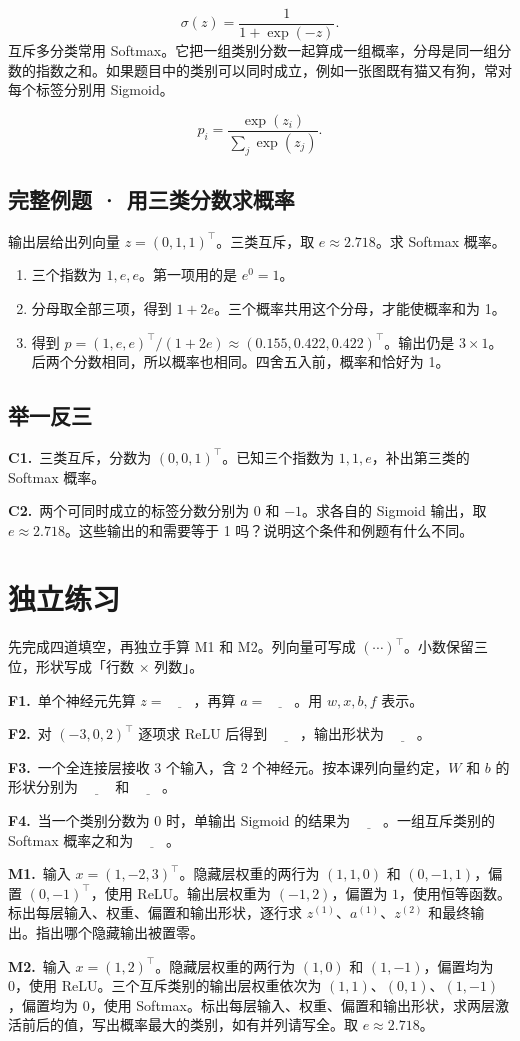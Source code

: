 \documentclass[UTF8,a4paper,11pt]{ctexart}
\newcommand{\CompactQuestion}[2]{\par\noindent\textbf{#1.}\ #2\par\vspace{.8em}}
\begin{document}
\[\sigma(z)=\frac{1}{1+\exp(-z)}.\]
互斥多分类常用 Softmax。它把一组类别分数一起算成一组概率，分母是同一组分数的指数之和。如果题目中的类别可以同时成立，例如一张图既有猫又有狗，常对每个标签分别用 Sigmoid。

\[p_i=\frac{\exp(z_i)}{\sum_j\exp(z_j)}.\]
\subsection{完整例题 · 用三类分数求概率}
输出层给出列向量 $z=(0,1,1)^\top$。三类互斥，取 $e\approx2.718$。求 Softmax 概率。

\begin{enumerate}
\item 三个指数为 $1,e,e$。第一项用的是 $e^0=1$。
\item 分母取全部三项，得到 $1+2e$。三个概率共用这个分母，才能使概率和为 1。
\item 得到 $p=(1,e,e)^\top/(1+2e)\approx(0.155,0.422,0.422)^\top$。输出仍是 $3\times1$。后两个分数相同，所以概率也相同。四舍五入前，概率和恰好为 1。
\end{enumerate}
\subsection{举一反三}
\CompactQuestion{C1}{三类互斥，分数为 $(0,0,1)^\top$。已知三个指数为 $1,1,e$，补出第三类的 Softmax 概率。}
\CompactQuestion{C2}{两个可同时成立的标签分数分别为 $0$ 和 $-1$。求各自的 Sigmoid 输出，取 $e\approx2.718$。这些输出的和需要等于 1 吗？说明这个条件和例题有什么不同。}
\clearpage
\section{独立练习}
先完成四道填空，再独立手算 M1 和 M2。列向量可写成 $(\cdots)^\top$。小数保留三位，形状写成「行数 $\times$ 列数」。

\CompactQuestion{F1}{单个神经元先算 $z=\underline{\qquad}$，再算 $a=\underline{\qquad}$。用 $w,x,b,f$ 表示。}
\CompactQuestion{F2}{对 $(-3,0,2)^\top$ 逐项求 ReLU 后得到 $\underline{\qquad}$，输出形状为 $\underline{\qquad}$。}
\CompactQuestion{F3}{一个全连接层接收 3 个输入，含 2 个神经元。按本课列向量约定，$W$ 和 $b$ 的形状分别为 $\underline{\qquad}$ 和 $\underline{\qquad}$。}
\CompactQuestion{F4}{当一个类别分数为 0 时，单输出 Sigmoid 的结果为 $\underline{\qquad}$。一组互斥类别的 Softmax 概率之和为 $\underline{\qquad}$。}
\CompactQuestion{M1}{输入 $x=(1,-2,3)^\top$。隐藏层权重的两行为 $(1,1,0)$ 和 $(0,-1,1)$，偏置 $(0,-1)^\top$，使用 ReLU。输出层权重为 $(-1,2)$，偏置为 $1$，使用恒等函数。标出每层输入、权重、偏置和输出形状，逐行求 $z^{(1)}$、$a^{(1)}$、$z^{(2)}$ 和最终输出。指出哪个隐藏输出被置零。}
\CompactQuestion{M2}{输入 $x=(1,2)^\top$。隐藏层权重的两行为 $(1,0)$ 和 $(1,-1)$，偏置均为 0，使用 ReLU。三个互斥类别的输出层权重依次为 $(1,1)$、$(0,1)$、$(1,-1)$，偏置均为 0，使用 Softmax。标出每层输入、权重、偏置和输出形状，求两层激活前后的值，写出概率最大的类别，如有并列请写全。取 $e\approx2.718$。}
\clearpage
\end{document}
